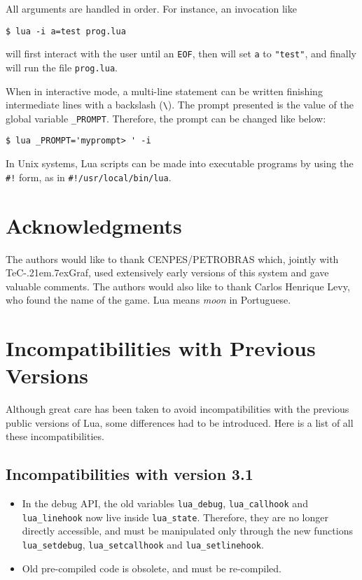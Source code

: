 \documentclass[11pt]{article}
\def\tecgraf{{\sf TeC\kern-.21em\lower.7ex\hbox{Graf}}}
\newcommand{\Index}[1]{#1\index{#1}}
\begin{document}
All arguments are handled in order.
For instance, an invocation like
\begin{verbatim}
$ lua -i a=test prog.lua
\end{verbatim}
will first interact with the user until an \verb|EOF|,
then will set \verb|a| to \verb|"test"|,
and finally will run the file \verb|prog.lua|.

When in interactive mode,
a multi-line statement can be written finishing intermediate
lines with a backslash (\verb|\|).
The prompt presented is the value of the global variable \verb|_PROMPT|.
Therefore, the prompt can be changed like below:
\begin{verbatim}
$ lua _PROMPT='myprompt> ' -i
\end{verbatim}

In Unix systems, Lua scripts can be made into executable programs
by using the \verb|#!| form,
as in \verb|#!/usr/local/bin/lua|.

\section*{Acknowledgments}

The authors would like to thank CENPES/PETROBRAS which,
jointly with \tecgraf, used extensively early versions of
this system and gave valuable comments.
The authors would also like to thank Carlos Henrique Levy,
who found the name of the game.
Lua means \emph{moon} in Portuguese.



\appendix

\section*{Incompatibilities with Previous Versions}

Although great care has been taken to avoid incompatibilities with
the previous public versions of Lua,
some differences had to be introduced.
Here is a list of all these incompatibilities.

\subsection*{Incompatibilities with \Index{version 3.1}}
\begin{itemize}
\item
In the debug API, the old variables \verb|lua_debug|,
\verb|lua_callhook| and \verb|lua_linehook| now live inside \verb|lua_state|.
Therefore, they are no longer directly accessible, and must be
manipulated only through the new functions \verb|lua_setdebug|,
\verb|lua_setcallhook| and \verb|lua_setlinehook|.

\item Old pre-compiled code is obsolete, and must be re-compiled.
\end{itemize}
\end{document}

